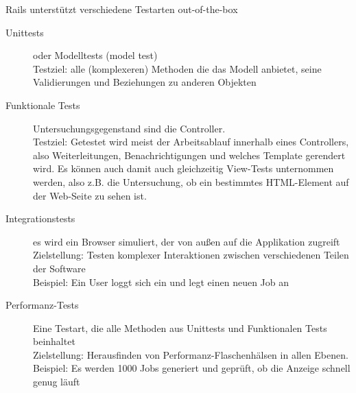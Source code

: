 Rails unterstützt verschiedene Testarten out-of-the-box
\begin{description}
 \item[Unittests] oder Modelltests (model test)\\
 Testziel: alle (komplexeren) Methoden die das Modell anbietet, seine Validierungen und Beziehungen zu anderen Objekten
 \item[Funktionale Tests] Untersuchungsgegenstand sind die Controller. \\
 Testziel: Getestet wird meist der Arbeitsablauf innerhalb eines Controllers, also Weiterleitungen, Benachrichtigungen und welches Template gerendert wird.
 Es können auch damit auch gleichzeitig View-Tests unternommen werden, also z.B. die Untersuchung, ob ein bestimmtes HTML-Element auf der Web-Seite zu sehen ist.
 \item[Integrationstests] es wird ein Browser simuliert, der von außen auf die Applikation zugreift
 Zielstellung: Testen komplexer Interaktionen zwischen verschiedenen Teilen der Software\\
 Beispiel: Ein User loggt sich ein und legt einen neuen Job an
 \item[Performanz-Tests] Eine Testart, die alle Methoden aus Unittests und Funktionalen Tests beinhaltet\\
 Zielstellung: Herausfinden von Performanz-Flaschenhälsen in allen Ebenen. \\
 Beispiel: Es werden 1000 Jobs generiert und geprüft, ob die Anzeige schnell genug läuft
\end{description}
